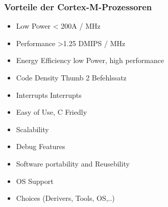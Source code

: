 \subsubsection{Vorteile der Cortex-M-Prozessoren}
\begin{multicols}{2}
\begin{itemize}
    \item Low Power
        \subitem < 200\mu A / MHz
    \item Performance
        \subitem >1.25 DMIPS / MHz
    \item Energy Efficiency
        \subitem low Power, high performance
    \item Code Density
        \subitem Thumb 2 Befehlssatz
    \item Interrupts
         Interrupts
    \item Easy of Use, C Friedly
    \item Scalability
    \item Debug Features
    \item Software portability and Reusebility
    \item OS Support
    \item Choices (Derivers, Tools, OS,..)    
\end{itemize}
\end{multicols}






















